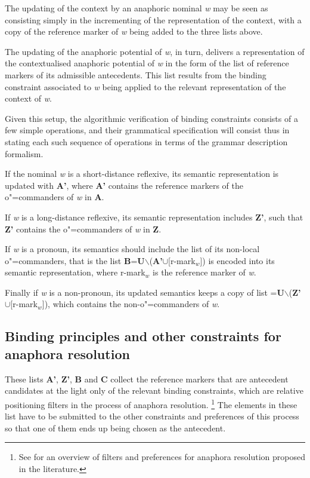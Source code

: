 \documentclass[output=paper
	        ,collection
	        ,collectionchapter
 	        ,biblatex
                ,babelshorthands
                ,newtxmath
                ,draftmode
                ,colorlinks, citecolor=brown
]{langscibook}
\begin{document}
The updating of the context by an anaphoric nominal {\it w} may be seen
as consisting simply in the
incrementing of the representation of the context, with 
a copy of the reference marker of {\it w} being added to
the three lists above.


The updating of the anaphoric potential of {\it w}, in turn, delivers a representation
of the contextualised anaphoric potential of {\it w} in the form of the
list of reference markers of its admissible antecedents. This list
results from the binding constraint associated to {\it w} being applied  to
the relevant representation of the context of {\it w}.

Given this setup, the algorithmic verification of 
binding constraints consists of a few simple operations, and their
grammatical specification will consist thus in stating each such sequence of
operations in terms of the grammar description formalism. 

If the nominal {\it w} is a short-distance
reflexive, its semantic  representation is updated with {\bf A'}, where {\bf A'}
contains the reference  markers of the \mbox{o"=commanders} of {\it w} in {\bf A}. 

If {\it w} is a
long-distance  reflexive, its semantic representation includes {\bf Z'}, such that {\bf Z'}
contains the \mbox{o"=commanders} of {\it w} in {\bf Z}. 

If {\it w} is a pronoun, its semantics 
should include the list of its non-local \linebreak o"=commanders,
that is the list
{\bf B}={\bf U}$\backslash$({\bf A'}$\cup$[r-mark$_{w}$])
is encoded into its semantic representation, where r-mark$_{w}$ is the reference marker
of {\it w}.

Finally if {\it w} 
is a non-pronoun, its updated semantics keeps a copy of 
list ={\bf U}$\backslash$({\bf Z'}$\cup$[r-mark$_{w}$]),
which contains the non-o"=commanders of {\it w}.


\subsection{Binding principles and other constraints for anaphora resolution}

These lists {\bf A'}, {\bf Z'}, {\bf B} and {\bf C} collect
the reference markers that are antecedent candidates
at the light only of the relevant binding constraints, which are
relative positioning filters in the process of anaphora resolution.%
%
\footnote{See \cite[Chap.2]{branco:diss99} for an overview
of filters and preferences for anaphora resolution proposed in the literature.
}
% 
The elements in these list have to be submitted to the other constraints and preferences
of this process so that one of them ends up 
being chosen as the antecedent.
\end{document}
